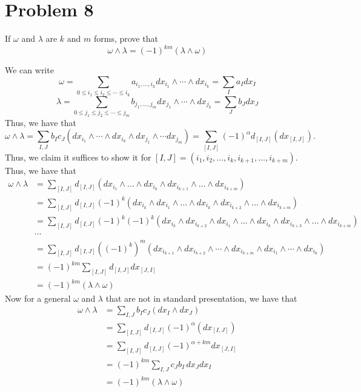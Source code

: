 \documentclass[11pt]{article}
\begin{document}
\newpage
\section*{Problem 8}
\begin{problem}
    If $\omega$ and $\lambda$ are $k$ and $m$ forms, prove that 
    \[\omega \wedge \lambda = (-1)^{km}(\lambda \wedge \omega)\]
\end{problem}
\begin{solution}
    We can write 
    \[\omega = \sum_{0 \leq i_1 \leq i_2 \leq \cdots \leq i_k} a_{i_1, \dots, i_k}dx_{i_1}\wedge \cdots \wedge dx_{i_k} = \sum _I a_I dx_I\]
    \[\lambda = \sum_{0 \leq j_1 \leq j_2 \leq \cdots \leq j_m} b_{j_1, \dots, j_m}dx_{j_1}\wedge \cdots \wedge dx_{j_k} = \sum_J b_J dx_J\] Thus, we have that 
    \[\omega \wedge \lambda = \sum_{I,J} b_I c_J (dx_{i_1}\wedge \cdots \wedge dx_{i_k} \wedge dx_{j_1}\wedge \cdots dx_{j_m}) = \sum_{[I,J]}(-1)^\alpha d_{[I,J]}(dx_{[I,J]}).\] Thus, we claim it suffices to show it for $[I,J] = (i_1, i_2, \dots, i_k, i_{k+1}, \dots, i_{k+m}).$ Thus, we have that 
    \begin{align*}
        \omega \wedge \lambda &= \sum_{[I,J]} d_{[I,J]}(dx_{i_1}\wedge \dots\wedge dx_{i_k}\wedge dx_{i_{k+1}}\wedge \dots\wedge dx_{i_{k+m}})\\
        &= \sum_{[I,J]} d_{[I,J]}(-1)^k(dx_{i_k}\wedge dx_{i_1}\wedge \dots\wedge dx_{i_{k}}\wedge dx_{i_{k+2}}\wedge \dots\wedge dx_{i_{k+m}})\\
        &= \sum_{[I,J]} d_{[I,J]}(-1)^k(-1)^k(dx_{i_k}\wedge dx_{i_{k+2}}\wedge dx_{i_1}\wedge \dots\wedge dx_{i_{k}}\wedge dx_{i_{k+3}}\wedge \dots\wedge dx_{i_{k+m}})\\
        &\cdots\\
        &= \sum_{[I,J]}d_{[I,J]} ((-1)^k)^m (dx_{i_{k+1}}\wedge dx_{i_{k+2}}\wedge \cdots \wedge dx_{i_{k+m}} \wedge dx_{i_{1}}\wedge \cdots  \wedge dx_{i_k})\\
        &= (-1)^{km}\sum_{[I,J]} d_{[I,J]}dx_{[J,I]}\\
        &= (-1)^{km} (\lambda \wedge \omega)
    \end{align*}
    Now for a general $\omega$ and $\lambda$ that are not in standard presentation, we have that 
    \begin{align*}
    \omega \wedge \lambda& = \sum_{I,J} b_I c_J(dx_I \wedge dx_J)\\&= \sum_{[I,J]}d_{[I,J]}(-1)^\alpha (dx_{[I,J]})\\ &= \sum_{[I,J]} d_{[I,J]}(-1)^{\alpha + km}dx_{[J,I]}\\& = (-1)^{km}\sum_{I,J}c_J b_I \,dx_J dx_I\\& = (-1)^{km}(\lambda \wedge \omega)    
    \end{align*}
    
\end{solution}
\end{document}
